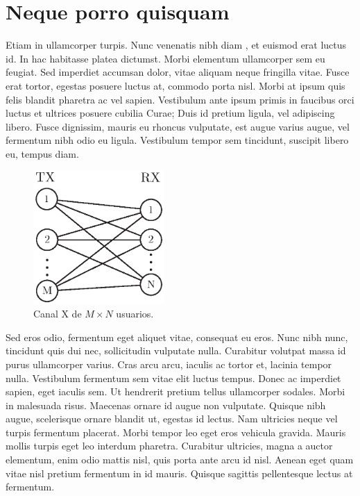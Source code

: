 \chapter{Neque porro quisquam}

Etiam in ullamcorper turpis. Nunc venenatis nibh diam \cite{doe2016}, et euismod erat luctus id. In hac habitasse platea dictumst. Morbi elementum ullamcorper sem eu feugiat. Sed imperdiet accumsan dolor, vitae aliquam neque fringilla vitae. Fusce erat tortor, egestas posuere luctus at, commodo porta nisl. Morbi at ipsum quis felis blandit pharetra ac vel sapien. Vestibulum ante ipsum primis in faucibus orci luctus et ultrices posuere cubilia Curae; Duis id pretium ligula, vel adipiscing libero. Fusce dignissim, mauris eu rhoncus vulputate, est augue varius augue, vel fermentum nibh odio eu ligula. Vestibulum tempor sem tincidunt, suscipit libero eu, tempus diam.

\begin{figure}[h!]
    \begin{center}
        \includegraphics[width=5cm]{content/fig/chap1/X_channel_MxN.eps}
    \end{center}
   \caption{Canal X de $M\times N$ usuarios.}
  \label{fig:X_channel_MxN}
\end{figure}

Sed eros odio, fermentum eget aliquet vitae, consequat eu eros. Nunc nibh nunc, tincidunt quis dui nec, sollicitudin vulputate nulla. Curabitur volutpat massa id purus ullamcorper varius. Cras arcu arcu, iaculis ac tortor et, lacinia tempor nulla. Vestibulum fermentum sem vitae elit luctus tempus. Donec ac imperdiet sapien, eget iaculis sem. Ut hendrerit pretium tellus ullamcorper sodales. Morbi in malesuada risus. Maecenas ornare id augue non vulputate. Quisque nibh augue, scelerisque ornare blandit ut, egestas id lectus. Nam ultricies neque vel turpis fermentum placerat. Morbi tempor leo eget eros vehicula gravida. Mauris mollis turpis eget leo interdum pharetra. Curabitur ultricies, magna a auctor elementum, enim odio mattis nisl, quis porta ante arcu id nisl. Aenean eget quam vitae nisl pretium fermentum in id mauris. Quisque sagittis pellentesque lectus at fermentum.

